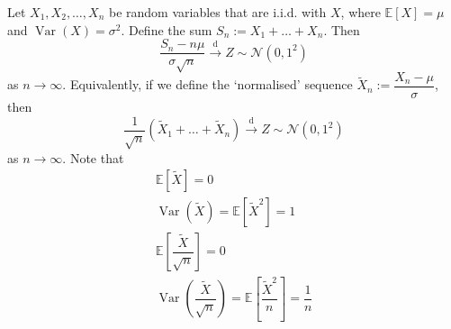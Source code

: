 \documentclass[11pt]{report} %
\begin{document}
Let $X_{1}, X_{2}, \dots, X_{n}$ be random variables that are i.i.d. with $X$, where $\mathbb{E}\left[X\right] = \mu$ and $\operatorname{Var}\left(X\right) = \sigma^{2}$. Define the sum $S_{n} := X_{1} + \dots + X_{n}$. Then
\begin{equation}
\dfrac{S_{n} - n\mu}{\sigma\sqrt{n}} \overset{\mathrm{d}}{\to} Z \sim \mathcal{N}\left(0, 1^{2}\right)
\end{equation}
as $n\to\infty$. Equivalently, if we define the `normalised' sequence $\widetilde{X}_{n} := \dfrac{X_{n} - \mu}{\sigma}$, then
\begin{equation}
\dfrac{1}{\sqrt{n}}\left(\widetilde{X}_{1} + \dots + \widetilde{X}_{n}\right) \overset{\mathrm{d}}{\to} Z \sim \mathcal{N}\left(0, 1^{2}\right) 
\end{equation}
as $n\to\infty$. Note that
\begin{gather}
\mathbb{E}\left[\widetilde{X}\right] = 0 \\
\operatorname{Var}\left(\widetilde{X}\right) = \mathbb{E}\left[\widetilde{X}^{2}\right] = 1 \\
\mathbb{E}\left[\dfrac{\widetilde{X}}{\sqrt{n}}\right] = 0 \\
\operatorname{Var}\left(\dfrac{\widetilde{X}}{\sqrt{n}}\right) =  \mathbb{E}\left[\dfrac{\widetilde{X}^{2}}{n}\right] = \dfrac{1}{n}
\end{gather}
\end{document}
